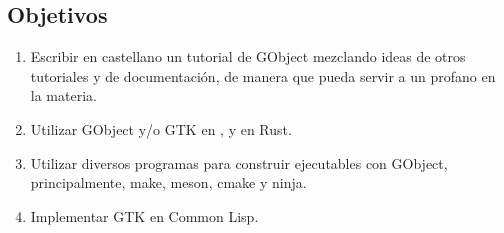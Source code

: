 \subsection{Objetivos} \label{subsec:objetivos}
\begin{enumerate}
  \tightlist
\item Escribir en castellano un tutorial de \textsf{GObject} mezclando ideas de otros tutoriales y de
  documentación, de manera que pueda servir a un profano en la materia.
\item Utilizar \textsf{GObject} y/o \textsf{GTK} en ,   y en \textsf{Rust}.
\item Utilizar diversos programas para construir ejecutables con \textsf{GObject}, principalmente,
  \textsf{make}, \textsf{meson}, \textsf{cmake} y \textsf{ninja}.
\item Implementar GTK en Common Lisp.
\end{enumerate}


